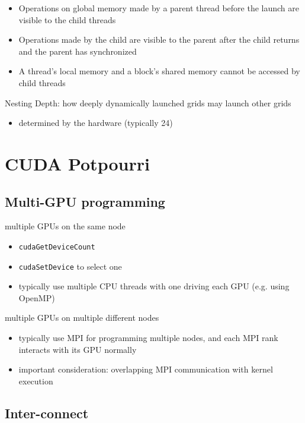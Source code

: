 \documentclass{article}
\begin{document}
\begin{itemize}
\item Operations on global memory made by a parent thread before the launch are visible to the child threads
\item Operations made by the child are visible to the parent after the child returns and the parent has synchronized
\item A thread's local memory and a block's shared memory cannot be accessed by child threads

\end{itemize}
Nesting Depth: how deeply dynamically launched grids may launch other grids

\begin{itemize}
\item determined by the hardware (typically 24)





\end{itemize}

\newpage
\section{CUDA Potpourri}

\subsection{Multi-GPU programming}

multiple GPUs on the same node

\begin{itemize}
\item \texttt{cudaGetDeviceCount}
\item \texttt{cudaSetDevice} to select one
\item typically use multiple CPU threads with one driving each GPU (e.g. using OpenMP)

\end{itemize}
multiple GPUs on multiple different nodes

\begin{itemize}
\item typically use MPI for programming multiple nodes, and each MPI rank interacts with its GPU normally
\item important consideration: overlapping MPI communication with kernel execution

\end{itemize}
\subsection{Inter-connect}
\end{document}
